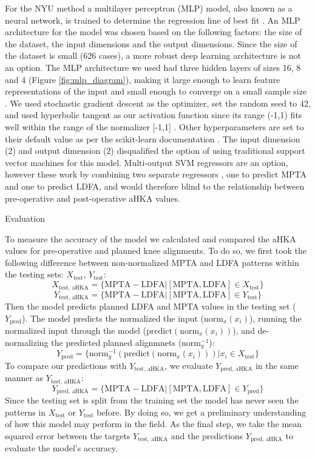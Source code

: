 \documentclass{article}
\begin{document}
	For the NYU method a multilayer perceptron (MLP) model, also known as a neural network, is trained to determine the regression line of best fit \cite{mlp-paper}.
An MLP architecture for the model was chosen based on the following factors: the size of the dataset, the input dimensions and the output dimensions.
Since the size of the dataset is small (626 cases), a more robust deep learning architecture is not an option.
The MLP architecture we used had three hidden layers of sizes 16, 8 and 4 (Figure \ref{fig:mlp_diagram}),
making it large enough to learn feature representations of the input and small enough to converge on a small sample size \cite{deep-learning-paper}.
We used stochastic gradient descent as the optimizer, set the random seed to 42, and used hyperbolic tangent as our activation function since its range (-1,1)
fits well within the range of the normalizer [-1,1] \cite{sgd-paper, mlp-paper}.
Other hyperparameters are set to their default value as per the scikit-learn documentation \cite{sklearn-sgd, adaptive-lr, scikit-learn, momentum-paper}.
The input dimension (2) and output dimension (2) disqualified the option of using traditional support vector machines for this model.
Multi-output SVM regressors are an option, however these work by combining two separate regressors \cite{svm-paper},
one to predict MPTA and one to predict LDFA, and would therefore blind to the relationship between pre-operative and post-operative aHKA values. 

Evaluation

	To measure the accuracy of the model we calculated and compared the aHKA values for pre-operative and planned knee alignments.
To do so, we first took the following difference between non-normalized MPTA and LDFA patterns within the testing sets: 
$X_\text{test}$, $Y_\text{test}$: 
$$X_\text{test, aHKA}=\{\text{MPTA} - \text{LDFA} | [\text{MPTA}, \text{LDFA}] \in X_\text{test}\}$$
$$Y_\text{test, aHKA}=\{\text{MPTA} - \text{LDFA} | [\text{MPTA}, \text{LDFA}] \in Y_\text{test}\}$$
Then the model predicts planned LDFA and MPTA values in the testing set ($Y_\text{pred}$). 
The model predicts the normalized the input ($\text{norm}_x(x_i)$), running the normalized input through the model ($\text{predict}(\text{norm}_x(x_i))$),
and de-normalizing the predicted planned alignmnets ($\text{norm}_y^{-1}$):
$$Y_\text{pred}=\{\text{norm}_y^{-1}(\text{predict}(\text{norm}_x(x_i))) | x_i \in X_\text{test}\}$$
To compare our predictions with $Y_\text{test, aHKA}$, we evaluate $Y_\text{pred, aHKA}$ in the same manner as $Y_\text{test, aHKA}$: 
$$Y_\text{pred, aHKA}=\{\text{MPTA} - \text{LDFA} | [\text{MPTA}, \text{LDFA}] \in Y_\text{pred}\}$$
Since the testing set is split from the training set the model has never seen the patterns in $X_\text{test}$ or $Y_\text{test}$ before.
By doing so, we get a preliminary understanding of how this model may perform in the field.
As the final step, we take the mean squared error between the targets $Y_\text{test, aHKA}$ and the predictions $Y_\text{pred, aHKA}$ to evaluate the model's accuracy.
\end{document}
